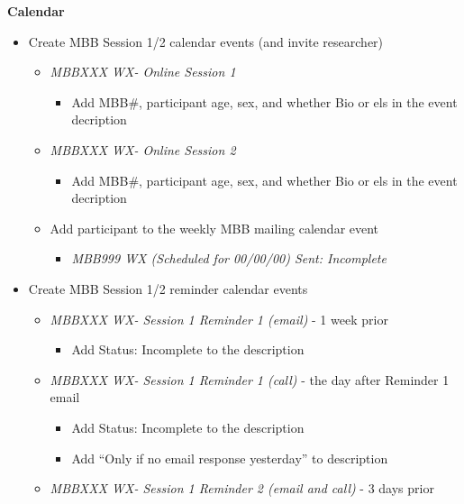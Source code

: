 \documentclass[]{book}
\providecommand{\tightlist}{%
  \setlength{\itemsep}{0pt}\setlength{\parskip}{0pt}}
\begin{document}
\textbf{Calendar}

\begin{itemize}
\tightlist
\item
  Create MBB Session 1/2 calendar events (and invite researcher)

  \begin{itemize}
  \tightlist
  \item
    \emph{MBBXXX WX- Online Session 1}

    \begin{itemize}
    \tightlist
    \item
      Add MBB\#, participant age, sex, and whether Bio or els in the event decription
    \end{itemize}
  \item
    \emph{MBBXXX WX- Online Session 2}

    \begin{itemize}
    \tightlist
    \item
      Add MBB\#, participant age, sex, and whether Bio or els in the event decription
    \end{itemize}
  \item
    Add participant to the weekly MBB mailing calendar event

    \begin{itemize}
    \tightlist
    \item
      \emph{MBB999 WX (Scheduled for 00/00/00) Sent: Incomplete}
    \end{itemize}
  \end{itemize}
\item
  Create MBB Session 1/2 reminder calendar events

  \begin{itemize}
  \tightlist
  \item
    \emph{MBBXXX WX- Session 1 Reminder 1 (email)} - 1 week prior

    \begin{itemize}
    \tightlist
    \item
      Add Status: Incomplete to the description
    \end{itemize}
  \item
    \emph{MBBXXX WX- Session 1 Reminder 1 (call)} - the day after Reminder 1 email

    \begin{itemize}
    \tightlist
    \item
      Add Status: Incomplete to the description
    \item
      Add ``Only if no email response yesterday'' to description
    \end{itemize}
  \item
    \emph{MBBXXX WX- Session 1 Reminder 2 (email and call)} - 3 days prior


\end{itemize}
\end{itemize}
\end{document}
